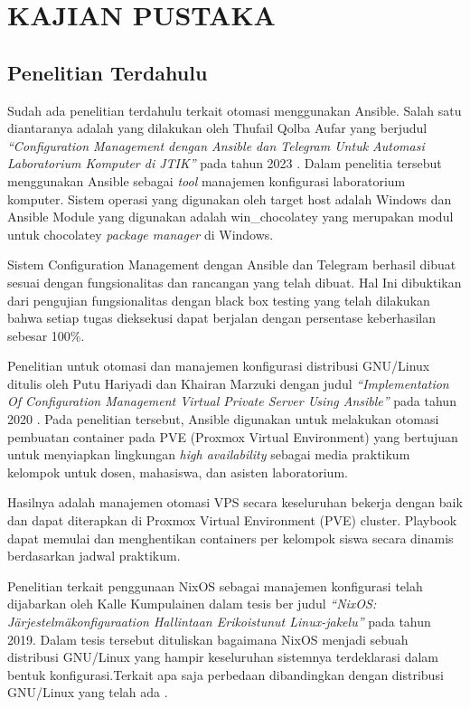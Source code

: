 \documentclass[10pt,]{report}
\begin{document}
\chapter{KAJIAN PUSTAKA}
\section{Penelitian Terdahulu}
\begin{adjustwidth}{0.70cm}{}
	\vspace{-3mm}
	\hspace\parindent
	Sudah ada penelitian terdahulu terkait otomasi menggunakan Ansible. Salah
	satu diantaranya adalah yang dilakukan oleh Thufail Qolba Aufar yang
	berjudul \textit{“Configuration Management dengan Ansible dan Telegram Untuk
		Automasi Laboratorium Komputer di JTIK”} pada tahun 2023 \parencite{thufail23}. Dalam penelitia
	tersebut menggunakan Ansible sebagai \textit{tool} manajemen konfigurasi
	laboratorium komputer. Sistem operasi yang digunakan oleh target host
	adalah Windows dan Ansible Module yang digunakan adalah win\_chocolatey yang
	merupakan modul untuk chocolatey \textit{package manager} di Windows.

	Sistem Configuration Management dengan Ansible dan Telegram berhasil dibuat
	sesuai dengan fungsionalitas dan rancangan yang telah dibuat. Hal Ini
	dibuktikan dari pengujian fungsionalitas dengan black box testing yang telah
	dilakukan bahwa setiap tugas dieksekusi dapat berjalan dengan persentase
	keberhasilan sebesar 100\%.

	Penelitian untuk otomasi dan manajemen konfigurasi distribusi GNU/Linux
	ditulis oleh Putu Hariyadi dan Khairan Marzuki dengan judul \textit{“Implementation
		Of Configuration Management Virtual Private Server Using Ansible”} pada
	tahun 2020 \parencite{hariyadi2020}. Pada penelitian tersebut, Ansible digunakan untuk melakukan
	otomasi pembuatan container pada PVE (Proxmox Virtual Environment) yang
	bertujuan untuk menyiapkan lingkungan \textit{high availability} sebagai media
	praktikum kelompok untuk dosen, mahasiswa, dan asisten laboratorium.

	Hasilnya adalah manajemen otomasi VPS secara keseluruhan bekerja dengan baik
	dan dapat diterapkan di Proxmox Virtual Environment (PVE) cluster. Playbook
	dapat memulai dan menghentikan containers per kelompok siswa secara dinamis
	berdasarkan jadwal praktikum.

	Penelitian terkait penggunaan NixOS sebagai manajemen konfigurasi telah
	dijabarkan oleh Kalle Kumpulainen dalam tesis ber judul \textit{“NixOS:
		Järjestelmäkonfiguraation Hallintaan Erikoistunut Linux-jakelu”} pada tahun
	2019. Dalam tesis tersebut dituliskan bagaimana NixOS menjadi sebuah
	distribusi GNU/Linux yang hampir keseluruhan sistemnya terdeklarasi dalam
	bentuk konfigurasi.Terkait apa saja perbedaan dibandingkan dengan
	distribusi GNU/Linux yang telah ada \parencite{kumpulainen_2019_nixos}.


\end{adjustwidth}
\end{document}
